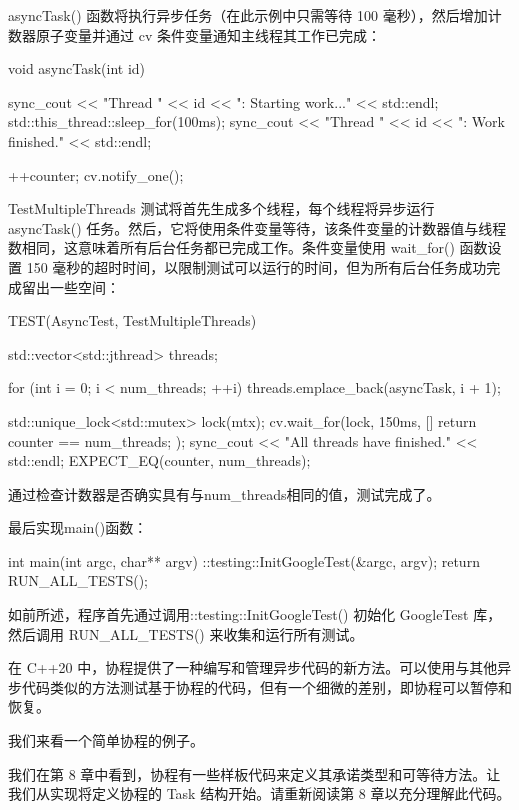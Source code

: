asyncTask() 函数将执行异步任务（在此示例中只需等待 100 毫秒），然后增加计数器原子变量并通过 cv 条件变量通知主线程其工作已完成：

\begin{cpp}
void asyncTask(int id) {
    sync_cout << "Thread " << id << ": Starting work..."
              << std::endl;
    std::this_thread::sleep_for(100ms);
    sync_cout << "Thread " << id << ": Work finished."
              << std::endl;

    ++counter;
    cv.notify_one();
}
\end{cpp}

TestMultipleThreads 测试将首先生成多个线程，每个线程将异步运行 asyncTask() 任务。然后，它将使用条件变量等待，该条件变量的计数器值与线程数相同，这意味着所有后台任务都已完成工作。条件变量使用 wait\_for() 函数设置 150 毫秒的超时时间，以限制测试可以运行的时间，但为所有后台任务成功完成留出一些空间：

\begin{cpp}
TEST(AsyncTest, TestMultipleThreads) {
    std::vector<std::jthread> threads;

    for (int i = 0; i < num_threads; ++i) {
        threads.emplace_back(asyncTask, i + 1);
    }

    {
        std::unique_lock<std::mutex> lock(mtx);
        cv.wait_for(lock, 150ms, [] {
            return counter == num_threads;
        });
        sync_cout << "All threads have finished."
                  << std::endl;
    }
    EXPECT_EQ(counter, num_threads);
}
\end{cpp}

通过检查计数器是否确实具有与num\_threads相同的值，测试完成了。

最后实现main()函数：

\begin{cpp}
int main(int argc, char** argv) {
    ::testing::InitGoogleTest(&argc, argv);
    return RUN_ALL_TESTS();
}
\end{cpp}

如前所述，程序首先通过调用::testing::InitGoogleTest() 初始化 GoogleTest 库，然后调用 RUN\_ALL\_TESTS() 来收集和运行所有测试。


在 C++20 中，协程提供了一种编写和管理异步代码的新方法。可以使用与其他异步代码类似的方法测试基于协程的代码，但有一个细微的差别，即协程可以暂停和恢复。

我们来看一个简单协程的例子。

我们在第 8 章中看到，协程有一些样板代码来定义其承诺类型和可等待方法。让我们从实现将定义协程的 Task 结构开始。请重新阅读第 8 章以充分理解此代码。

